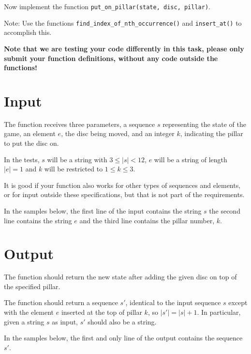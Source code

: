 
Now implement the function \texttt{put\_on\_pillar(state, disc, pillar)}.

Note: Use the functions \texttt{find\_index\_of\_nth\_occurrence()} and \texttt{insert\_at()} to accomplish this.

\textbf{Note that we are testing your code differently in this task,
please only submit your function definitions, without any code outside the functions!}


\section*{Input}

The function receives three parameters,
a sequence $s$ representing the state of the game,
an element $e$, the disc being moved,
and an integer $k$, indicating the pillar to put the disc on.

In the tests, $s$ will be a string with $3 \le |s| < 12$,
$e$ will be a string of length $|e| = 1$
and $k$ will be restricted to $1 \le k \le 3$.

It is good if your function also works for other types of sequences and elements,
or for input outside these specifications,
but that is not part of the requirements.

In the samples below,
the first line of the input contains the string $s$
the second line contains the string $e$
and the third line contains the pillar number, $k$.

\section*{Output}

The function should return the new state after adding the given disc on top of the specified pillar.

The function should return a sequence $s'$,
identical to the input sequence $s$
except with the element $e$ inserted at the top of pillar $k$,
so $|s'| = |s| + 1$.
In particular, given a string $s$ as input, $s'$ should also be a string.

In the samples below,
the first and only line of the output contains the sequence $s'$.
